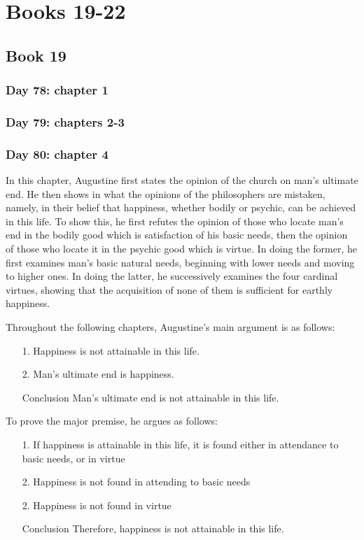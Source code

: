 \chapter{Books 19-22}
\section{Book 19}
\subsection{Day 78: chapter 1}
\subsection{Day 79: chapters 2-3}
\subsection{Day 80: chapter 4}
In this chapter, Augustine first states the opinion of the church on man's ultimate end. He then shows in what the opinions of the philosophers are mistaken, namely, in their belief that happiness, whether bodily or psychic, can be achieved in this life. To show this, he first refutes the opinion of those who locate man's end in the bodily good which is satisfaction of his basic needs, then the opinion of those who locate it in the psychic good which is virtue. In doing the former, he first examines man's basic natural needs, beginning with lower needs and moving to higher ones. In doing the latter, he successively examines the four cardinal virtues, showing that the acquisition of none of them is sufficient for earthly happiness.

Throughout the following chapters, Augustine's main argument is as follows:
\begin{itemize}
	\item[1.] Happiness is not attainable in this life.
	\item[2.] Man's ultimate end is happiness.
	\item[Conclusion] Man's ultimate end is not attainable in this life.
\end{itemize}

To prove the major premise, he argues as follows:

\begin{itemize}
	\item [1.] If happiness is attainable in this life, it is found either in attendance to basic needs, or in virtue
	\item[2.] Happiness is not found in attending to basic needs
	\item[2.] Happiness is not found in virtue
	\item[Conclusion] Therefore, happiness is not attainable in this life.
\end{itemize}
